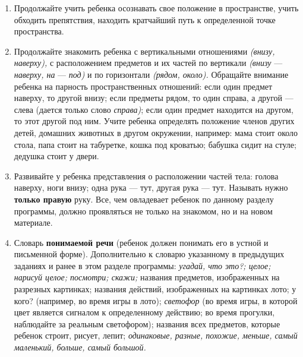 \documentclass[a5paper]{book}
\renewcommand{\emph}[1]{\textit{#1}}
\begin{document}
\begin{enumerate}
\def\labelenumi{\arabic{enumi}.}
\item
  
  Продолжайте учить ребенка осознавать свое положение в пространстве,
  учить обходить препятствия, находить кратчайший путь к определенной
  точке пространства.
  
\item
  
  Продолжайте знакомить ребенка с вертикальными отношениями
  \emph{(внизу, наверху),} с расположением предметов и их частей по
  вертикали \emph{(внизу} --- \emph{наверху, на} --- \emph{под)} и по
  горизонтали \emph{(рядом, около).} Обращайте внимание ребенка на
  парность пространственных отношений: если один предмет наверху, то
  другой внизу; если предметы рядом, то один справа, а другой --- слева
  (дается только слово \emph{справа)}; если один предмет находится на
  другом, то этот другой под ним. Учите ребенка определять положение
  членов других детей, домашних животных в другом окружении, например:
  мама стоит около стола, папа стоит на табуретке, кошка под кроватью;
  бабушка сидит на стуле; дедушка стоит у двери.
  
\item
  
  Развивайте у ребенка представления о расположении частей тела: голова
  наверху, ноги внизу; одна рука --- тут, другая рука --- тут. Называть
  нужно \textbf{только правую} руку. Все, чем овладевает ребенок по
  данному разделу программы, должно проявляться не только на знакомом,
  но и на новом материале.
  
\item
  
  Словарь \textbf{понимаемой речи} (ребенок должен понимать его в устной
  и письменной форме). Дополнительно к словарю указанному в предыдущих
  заданиях и ранее в этом разделе программы: \emph{угадай, что это?;
  целое; нарисуй целое; посмотри; скажи;} названия предметов,
  изображенных на разрезных картинках; названия действий, изображенных
  на картинках лото; у кого? (например, во время игры в лото);
  \emph{светофор} (во время игры, в которой цвет является сигналом к
  определенному действию; во время прогулки, наблюдайте за реальным
  светофором); названия всех предметов, которые ребенок строит, рисует,
  лепит; \emph{одинаковые, разные, похожие, меньше, самый маленький,
  больше, самый большой.}
  
\end{enumerate}
\end{document}
